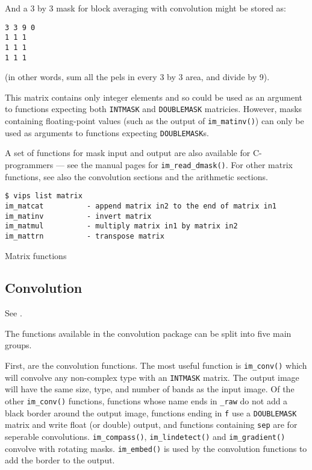 And a 3 by 3 mask for block averaging with convolution might be stored as:

\begin{verbatim}
3 3 9 0
1 1 1
1 1 1 
1 1 1
\end{verbatim}
  
\noindent
(in other words, sum all the pels in every 3 by 3 area, and divide by 9).

This matrix contains only integer elements and so could be used as an
argument to functions expecting both \verb+INTMASK+ and \verb+DOUBLEMASK+
matricies. However, masks containing floating-point values (such as the
output of \verb+im_matinv()+) can only be used as arguments to functions
expecting \verb+DOUBLEMASK+s.

A set of functions for mask input and output are also available for
C-programmers --- see the manual pages for \verb+im_read_dmask()+. For
other matrix functions, see also the convolution sections and the arithmetic
sections.

\begin{fig2}
\begin{verbatim}
$ vips list matrix
im_matcat          - append matrix in2 to the end of matrix in1
im_matinv          - invert matrix
im_matmul          - multiply matrix in1 by matrix in2
im_mattrn          - transpose matrix
\end{verbatim}
\caption{Matrix functions}
\label{fg:matricies}
\end{fig2}

\subsection{Convolution}

See .

The functions available in the convolution package can be split into five
main groups.

First, are the convolution functions. The most useful function is
\verb+im_conv()+ which will convolve any non-complex type with an
\verb+INTMASK+ matrix. The output image will have the same size, type, and
number of bands as the input image. Of the other \verb+im_conv()+ functions,
functions whose name ends in \verb+_raw+ do not add a black border around the
output image, functions ending in \verb+f+ use a \verb+DOUBLEMASK+ matrix
and write float (or double) output, and functions containing \verb+sep+
are for seperable convolutions.  \verb+im_compass()+, \verb+im_lindetect()+
and \verb+im_gradient()+ convolve with rotating masks.  \verb+im_embed()+
is used by the convolution functions to add the border to the output.

